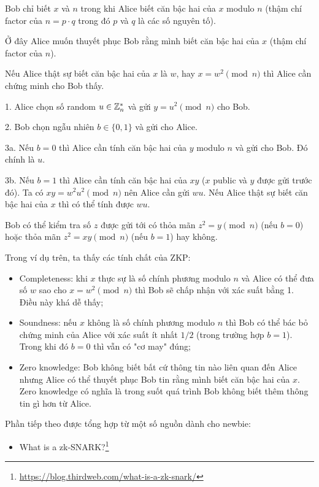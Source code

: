 Bob chỉ biết $x$ và $n$ trong khi Alice biết căn bậc hai của $x$ modulo $n$ (thậm chí factor của $n = p \cdot q$ trong đó $p$ và $q$ là các số nguyên tố).

Ở đây Alice muốn thuyết phục Bob rằng mình biết căn bậc hai của $x$ (thậm chí factor của $n$).

Nếu Alice thật sự biết căn bậc hai của $x$ là $w$, hay $x = w^2 \pmod n$ thì Alice cần chứng minh cho Bob thấy.

1. Alice chọn số random $u \in \mathbb{Z}_n^*$ và gửi $y = u^2 \pmod n$ cho Bob.

2. Bob chọn ngẫu nhiên $b \in \{ 0, 1 \}$ và gửi cho Alice.

3a. Nếu $b = 0$ thì Alice cần tính căn bậc hai của $y$ modulo $n$ và gửi cho Bob. Đó chính là $u$.

3b. Nếu $b = 1$ thì Alice cần tính căn bậc hai của $xy$ ($x$ public và $y$ được gửi trước đó). Ta có $xy = w^2 u^2 \pmod n$ nên Alice cần gửi $wu$. Nếu Alice thật sự biết căn bậc hai của $x$ thì có thể tính được $wu$.

Bob có thể kiểm tra số $z$ được gửi tới có thỏa mãn $z^2 = y \pmod n$ (nếu $b = 0$) hoặc thỏa mãn $z^2 = xy \pmod n$ (nếu $b = 1$) hay không.

Trong ví dụ trên, ta thấy các tính chất của ZKP:

\begin{itemize}
    \item Completeness: khi $x$ thực sự là số chính phương modulo $n$ và Alice có thể đưa số $w$ sao cho $x = w^2 \pmod n$ thì Bob sẽ chấp nhận với xác suất bằng 1. Điều này khá dễ thấy;
    \item Soundness: nếu $x$ không là số chính phương modulo $n$ thì Bob có thể bác bỏ chứng minh của Alice với xác suất ít nhất $1/2$ (trong trường hợp $b=1$). Trong khi đó $b=0$ thì vẫn có "cơ may" đúng;
    \item Zero knowledge: Bob không biết bất cứ thông tin nào liên quan đến Alice nhưng Alice có thể thuyết phục Bob tin rằng mình biết căn bậc hai của $x$. Zero knowledge có nghĩa là trong suốt quá trình Bob không biết thêm thông tin gì hơn từ Alice.
\end{itemize}

Phần tiếp theo được tổng hợp từ một số nguồn dành cho newbie:

\begin{itemize}
    \item What is a zk-SNARK?\footnote{\url{https://blog.thirdweb.com/what-is-a-zk-snark/}}
\end{itemize}


